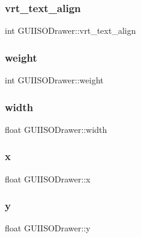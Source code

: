 \subsubsection{\texorpdfstring{vrt\+\_\+text\+\_\+align}{vrt\_text\_align}}
{\footnotesize\ttfamily int G\+U\+I\+I\+S\+O\+Drawer\+::vrt\+\_\+text\+\_\+align}

\hypertarget{class_g_u_i_i_s_o_drawer_a5a67d8f9b025602a3292910b32ee1a4a}{}\label{class_g_u_i_i_s_o_drawer_a5a67d8f9b025602a3292910b32ee1a4a} 
\subsubsection{\texorpdfstring{weight}{weight}}
{\footnotesize\ttfamily int G\+U\+I\+I\+S\+O\+Drawer\+::weight}

\hypertarget{class_g_u_i_i_s_o_drawer_ab559dd7333ceaa8ead89c9eefb38f471}{}\label{class_g_u_i_i_s_o_drawer_ab559dd7333ceaa8ead89c9eefb38f471} 
\subsubsection{\texorpdfstring{width}{width}}
{\footnotesize\ttfamily float G\+U\+I\+I\+S\+O\+Drawer\+::width}

\hypertarget{class_g_u_i_i_s_o_drawer_a983dcc2c72b355fcffac7d0d0cbec213}{}\label{class_g_u_i_i_s_o_drawer_a983dcc2c72b355fcffac7d0d0cbec213} 
\subsubsection{\texorpdfstring{x}{x}}
{\footnotesize\ttfamily float G\+U\+I\+I\+S\+O\+Drawer\+::x}

\hypertarget{class_g_u_i_i_s_o_drawer_ae63d81ef3e015cc3f3497363104c909f}{}\label{class_g_u_i_i_s_o_drawer_ae63d81ef3e015cc3f3497363104c909f} 
\subsubsection{\texorpdfstring{y}{y}}
{\footnotesize\ttfamily float G\+U\+I\+I\+S\+O\+Drawer\+::y}

